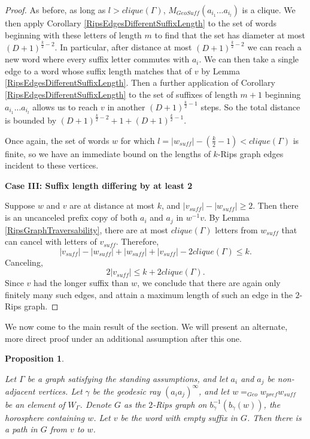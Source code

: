 \documentclass{amsart}
\newtheorem{proposition}[theorem]{Proposition}
\theoremstyle{definition}
\theoremstyle{remark}
\begin{document}
\begin{proof}
		As before, as long as $l>clique(\Gamma)$, $M_{GeoSuff}(a_{i_1}...a_{i_l})$ is a clique. We then apply Corollary \ref{RipsEdgesDifferentSuffixLength}  to the set of words beginning with these letters of length $m$ to find that the set has diameter at most $(D+1)^{\frac{k}{2}-2}$. In particular, after distance at most $(D+1)^{\frac{k}{2}-2}$ we can reach a new word where every suffix letter commutes with $a_i$. We can then take a single edge to a word whose suffix length matches that of $v$ by Lemma \ref{RipsEdgesDifferentSuffixLength}. Then a further application of Corollary \ref{RipsEdgesDifferentSuffixLength} to the set of suffixes of length $m+1$ beginning $a_{i_1}...a_{i_l}$ allows us to reach $v$ in another $(D+1)^{\frac{k}{2}-1}$ steps. So the total distance is bounded by $(D+1)^{\frac{k}{2}-2}+1+(D+1)^{\frac{k}{2}-1}$.
		
		Once again, the set of words $w$ for which $l=|w_{suff}|-(\frac{k}{2}-1)<clique(\Gamma)$ is finite, so we have an immediate bound on the lengths of $k$-Rips graph edges incident to these vertices.
		
		\textbf{Case III: Suffix length differing by at least 2}
		
		Suppose $w$ and $v$ are at distance at most $k$, and $|v_{suff}|-|w_{suff}| \ge 2$. Then there is an uncanceled prefix copy of both $a_i$ and $a_j$ in $w^{-1}v$. By Lemma \ref{RipsGraphTraversability}, there are at most $clique(\Gamma)$ letters from $w_{suff}$ that can cancel with letters of $v_{suff}$. Therefore, $$|v_{suff}|-|w_{suff}|+|w_{suff}|+|v_{suff}|-2clique(\Gamma)\le k.$$ Canceling, $$2|v_{suff}|\le k+2clique(\Gamma).$$ Since $v$ had the longer suffix than $w$, we conclude that there are again only finitely many such edges, and attain a maximum length of such an edge in the $2$-Rips graph. \end{proof}
	
	
	We now come to the main result of the section. We will present an alternate, more direct proof under an additional assumption after this one.
	
	\begin{proposition} \label{RipsGraphOriginConnectivity}
		
		Let $\Gamma$ be a graph satisfying the standing assumptions, and let $a_i$ and $a_j$ be non-adjacent vertices. Let $\gamma$ be the geodesic ray $(a_ia_j)^\infty$, and let  $w=_{Geo}w_{pref}w_{suff}$ be an element of $W_\Gamma$. Denote $G$ as the $2$-Rips graph on $b_{\gamma}^{-1}(b_{\gamma}(w))$, the horosphere containing $w$. Let $v$ be the word with empty suffix in $G$. Then there is a path in $G$ from $v$ to $w$.
		
	\end{proposition}
	
\end{document}
